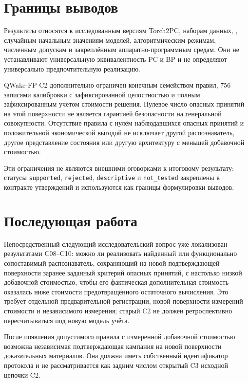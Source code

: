 \section{Границы выводов}

Результаты относятся к исследованным версиям Torch2PC, наборам данных,
, случайным начальным значениям моделей, алгоритмическим
режимам, численным допускам и закреплённым аппаратно-программным средам. Они не
устанавливают универсальную эквивалентность PC и BP и не определяют
универсально предпочтительную реализацию.

QWake-FP C2 дополнительно ограничен конечным семейством правил, 756 записями
калибровки с зафиксированной целостностью и полным зафиксированным учётом
стоимости решения. Нулевое число опасных принятий на этой поверхности не
является гарантией безопасности на генеральной совокупности. Отсутствие
правила с нулём наблюдавшихся опасных принятий и положительной экономической
выгодой не исключает другой
распознаватель, другое представление состояния или другую архитектуру с меньшей
добавочной стоимостью.

Эти ограничения не являются внешними оговорками к итоговому результату:
статусы \texttt{supported}, \texttt{rejected}, \texttt{descriptive} и
\texttt{not\_tested} закреплены в контракте утверждений и используются как границы формулировки
выводов.

\section{Последующая работа}

Непосредственный следующий исследовательский вопрос уже локализован
результатами C08--C10: можно ли реализовать найденный или функционально
сопоставимый распознаватель, сохраняющий на новой подтверждающей поверхности
заранее заданный критерий опасных принятий, с настолько низкой добавочной
стоимостью, чтобы его фактическая дополнительная стоимость оказалась ниже
стоимости предотвращённого остаточного вычисления. Это требует отдельной
предварительной регистрации, новой поверхности измерений стоимости и
независимого измерения; старый C2 не должен ретроспективно пересчитываться под
новую модель учёта.

После появления допустимого правила с измеренной добавочной стоимостью
возможна независимая подтверждающая кампания на новой поверхности доказательных
материалов. Она должна иметь собственный идентификатор протокола и не
рассматривается как задним числом открытый C3 исходной цепочки C2.

